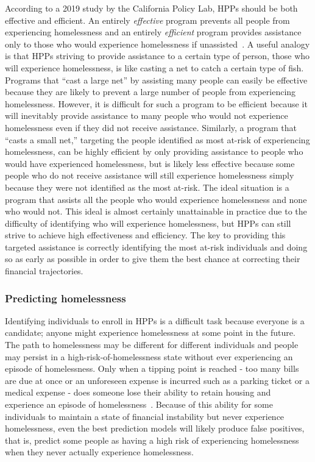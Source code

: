\documentclass[10pt,letterpaper]{article}
\begin{document}
According to a 2019 study by the California Policy Lab, HPPs should be both effective and efficient. An entirely \textit{effective} program prevents all people from experiencing homelessness and an entirely \textit{efficient} program provides assistance only to those who would experience homelessness if unassisted~\cite{von2019predicting}. A useful analogy is that HPPs striving to provide assistance to a certain type of person, those who will experience homelessness, is like casting a net to catch a certain type of fish. Programs that ``cast a large net'' by assisting many people can easily be effective because they are likely to prevent a large number of people from experiencing homelessness. However, it is difficult for such a program to be efficient because it will inevitably provide assistance to many people who would not experience homelessness even if they did not receive assistance. Similarly, a program that ``casts a small net,'' targeting the people identified as most at-risk of experiencing homelessness, can be highly efficient by only providing assistance to people who would have experienced homelessness, but is likely less effective because some people who do not receive assistance will still experience homelessness simply because they were not identified as the most at-risk. The ideal situation is a program that assists all the people who would experience homelessness and none who would not. This ideal is almost certainly unattainable in practice due to the difficulty of identifying who will experience homelessness, but HPPs can still strive to achieve high effectiveness and efficiency. The key to providing this targeted assistance is correctly identifying the most at-risk individuals and doing so as early as possible in order to give them the best chance at correcting their financial trajectories.

\subsubsection*{Predicting homelessness}
Identifying individuals to enroll in HPPs is a difficult task because everyone is a candidate; anyone might experience homelessness at some point in the future. The path to homelessness may be different for different individuals and people may persist in a high-risk-of-homelessness state without ever experiencing an episode of homelessness. Only when a tipping point is reached - too many bills are due at once or an unforeseen expense is incurred such as a parking ticket or a medical expense - does someone lose their ability to retain housing and experience an episode of homelessness~\cite{o2004wrong}. Because of this ability for some individuals to maintain a state of financial instability but never experience homelessness, even the best prediction models will likely produce false positives, that is, predict some people as having a high risk of experiencing homelessness when they never actually experience homelessness.
\end{document}
